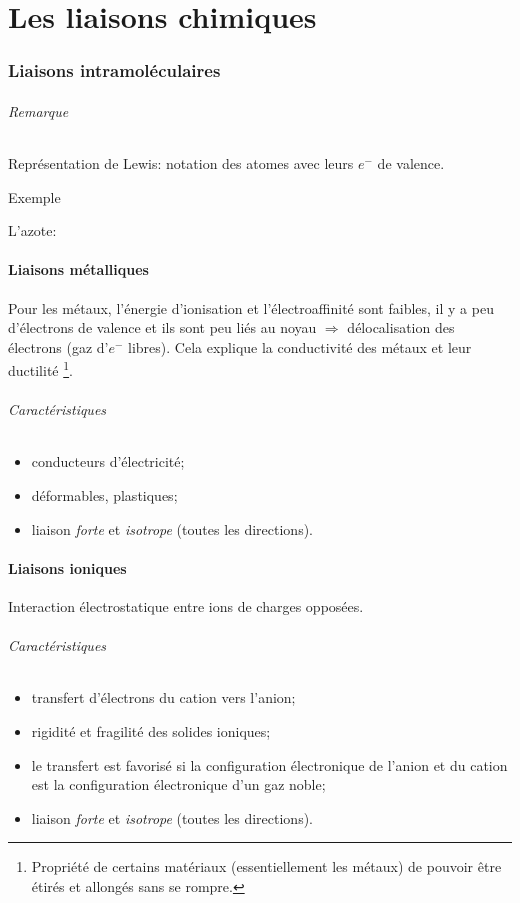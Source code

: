 \part{Les liaisons chimiques}
\section{Liaisons intramoléculaires}
\paragraph{Remarque} Représentation de Lewis: notation des atomes avec leurs $e^-$ de valence.

\subparagraph{Exemple} L'azote:\hspace{0.7cm} 

\subsection{Liaisons métalliques}
Pour les métaux,
l'énergie d'ionisation et l'électroaffinité sont faibles,
il y a peu d'électrons de valence et ils sont peu liés au noyau $\Rightarrow$
délocalisation des électrons (gaz d'$e^-$ libres).
Cela explique la conductivité des métaux et leur ductilité
\footnote{Propriété de certains matériaux (essentiellement les métaux)
de pouvoir être étirés et allongés sans se rompre.}.
\paragraph{Caractéristiques}
\begin{itemize}
  \item conducteurs d'électricité;
  \item déformables, plastiques;
  \item liaison \emph{forte} et \emph{isotrope} (toutes les directions).
\end{itemize}

\subsection{Liaisons ioniques}
Interaction électrostatique entre ions de charges opposées.
\paragraph{Caractéristiques}
\begin{itemize}
  \item transfert d'électrons du cation vers l'anion;
  \item rigidité et fragilité des solides ioniques;
  \item le transfert est favorisé si la configuration électronique de l'anion
    et du cation est la configuration électronique d'un gaz noble;
  \item liaison \emph{forte} et \emph{isotrope} (toutes les directions).
\end{itemize}

